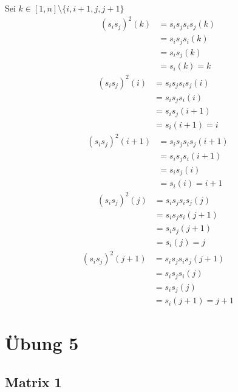 \documentclass[10pt,a4paper]{article}
\begin{document}
Sei $k \in [1, n] \setminus \{i, i + 1, j, j + 1\}$
\begin{align*}
(s_{i}s_{j})^{2}(k) & = s_{i}s_{j}s_{i}s_{j}(k)\\
& = s_{i}s_{j}s_{i}(k)\\
& = s_{i}s_{j}(k)\\
& = s_{i}(k) = k
\end{align*}
\begin{align*}
(s_{i}s_{j})^{2}(i) & = s_{i}s_{j}s_{i}s_{j}(i)\\
& = s_{i}s_{j}s_{i}(i)\\
& = s_{i}s_{j}(i + 1)\\
& = s_{i}(i + 1) = i
\end{align*}
\begin{align*}
(s_{i}s_{j})^{2}(i + 1) & = s_{i}s_{j}s_{i}s_{j}(i + 1)\\
& = s_{i}s_{j}s_{i}(i + 1)\\
& = s_{i}s_{j}(i)\\
& = s_{i}(i) = i + 1
\end{align*}
\begin{align*}
(s_{i}s_{j})^{2}(j) & = s_{i}s_{j}s_{i}s_{j}(j)\\
& = s_{i}s_{j}s_{i}(j + 1)\\
& = s_{i}s_{j}(j + 1)\\
& = s_{i}(j) = j
\end{align*}
\begin{align*}
(s_{i}s_{j})^{2}(j + 1) & = s_{i}s_{j}s_{i}s_{j}(j + 1)\\
& = s_{i}s_{j}s_{i}(j)\\
& = s_{i}s_{j}(j)\\
& = s_{i}(j + 1) = j + 1
\end{align*}

\section*{Übung 5}

\subsection*{Matrix 1}
\end{document}
